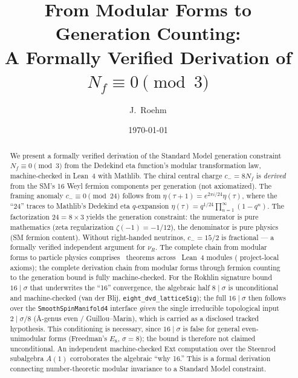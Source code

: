 \documentclass[aps,prl,twocolumn,superscriptaddress]{revtex4-2}
\begin{document}
\title{From Modular Forms to Generation Counting:\\
A Formally Verified Derivation of $N_f \equiv 0 \pmod{3}$}

\author{J.~Roehm}

\date{\today}

\begin{abstract}
We present a formally verified derivation of the Standard Model generation
constraint $N_f \equiv 0 \pmod{3}$ from the Dedekind eta function's modular
transformation law, machine-checked in Lean~4 with Mathlib. The chiral
central charge $c_- = 8 N_f$ is \emph{derived} from the SM's 16 Weyl
fermion components per generation (not axiomatized). The framing anomaly
$c_- \equiv 0 \pmod{24}$ follows from $\eta(\tau+1) = e^{2\pi i/24}\eta(\tau)$,
where the ``24'' traces to Mathlib's Dedekind eta $q$-expansion
$\eta(\tau) = q^{1/24}\prod_{n=1}^\infty(1-q^n)$. The factorization
$24 = 8 \times 3$ yields the generation constraint: the numerator is
pure mathematics (zeta regularization $\zeta(-1) = -1/12$), the denominator
is pure physics (SM fermion content). Without right-handed neutrinos,
$c_- = 15/2$ is fractional --- a formally verified independent argument
for $\nu_R$. The complete chain from modular forms to particle physics
comprises \totaltheorems{}~theorems across \leanmodules{}~Lean~4 modules
(\axiomcount{} project-local axioms); the complete
derivation chain from modular forms through fermion counting to the
generation bound is fully machine-checked. For the Rokhlin signature
bound $16 \mid \sigma$ that underwrites the ``16'' convergence, the
algebraic half $8 \mid \sigma$ is unconditional and machine-checked
(van der Blij, \texttt{eight\_dvd\_latticeSig}); the full $16 \mid \sigma$
then follows over the \texttt{SmoothSpinManifold4} interface \emph{given}
the single irreducible topological input $2 \mid \sigma/8$ (\^A-genus even
/ Guillou--Marin), which is carried as a disclosed tracked hypothesis.
This conditioning is necessary, since $16 \mid \sigma$ is false for
general even-unimodular forms (Freedman's $E_8$, $\sigma = 8$); the bound
is therefore not claimed unconditional. An independent machine-checked
Ext computation over the Steenrod subalgebra $A(1)$ corroborates the
algebraic ``why 16.'' This is a formal derivation connecting
number-theoretic modular invariance to a Standard Model constraint.
\end{abstract}

\maketitle
\end{document}
